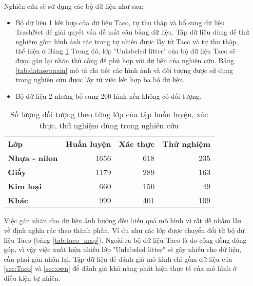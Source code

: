\documentclass[../the.tex]{subfiles}
\begin{document}
{\fontsize{13}{12} \selectfont

Nghiên cứu sẽ sử dụng các bộ dữ liệu như sau:

\begin{itemize}
	\item Bộ dữ liệu 1 kết hợp của dữ liệu Taco, tự thu thập và bổ sung dữ liệu TrashNet để giải quyết vấn đề mất cân bằng dữ liệu. Tập dữ liệu dùng để thử nghiệm gồm hình ảnh rác trong tự nhiên được lấy từ Taco và tự thu thập, thể hiện ở Bảng \ref{tab:datasettest}
	      Trong đó, lớp "Unlabeled litter" của bộ dữ liệu Taco sẽ được gán lại nhãn thủ công để phù hợp với dữ liệu của nghiên cứu. Bảng \ref{tab:datasetmain} mô tả chi tiết các hình ảnh và đối tượng được sử dụng trong nghiên cứu được lấy từ việc kết hợp ba bộ dữ liệu.\label{item:dataset}
	\item Bộ dữ liệu 2 nhưng bổ sung 200 hình nền không có đối tượng.
\end{itemize}

}

\begin{table}[!ht]
	\centering
	\caption{Số lượng đối tượng theo từng lớp của tập huấn luyện, xác thực, thử nghiệm dùng trong nghiên cứu}
	\begin{tabular}{|l|r|r|r|}
		\cline{1-4}
		\textbf{Lớp}          & \textbf{Huấn luyện} & \textbf{Xác thực} & \textbf{Thử nghiệm}\\ \cline{1-4}
		\textbf{Nhựa - nilon} & 1656 & 618 & 235                \\ \cline{1-4}
		\textbf{Giấy}         & 1179 & 289 & 163                \\ \cline{1-4}
		\textbf{Kim loại}     & 660 & 150 & 49               \\ \cline{1-4}
		\textbf{Khác}         & 999 & 401 & 109               \\ \cline{1-4}
	\end{tabular}

	\label{tab:datasettest}
\end{table}

{\fontsize{13}{12} \selectfont

Việc gán nhãn cho dữ liệu ảnh hưởng đến hiểu quả mô hình vì rất dễ nhầm lẫn về định nghĩa rác theo thành phần. Ví dụ như các lớp được chuyển đổi từ bộ dữ liệu Taco (bảng \ref{tab:taco_map}).
Ngoài ra bộ dữ liệu Taco là do cộng đồng đóng góp, vì vậy việc xuất hiện nhiều lớp "Unlabeled litter" sẽ gây nhiễu cho dữ liệu, cần phải gán nhãn lại.
Tập dữ liệu để đánh giá mô hình chỉ gồm dữ liệu của \ref{sec:Taco} và \ref{sec:own} để đánh giá khả năng phát hiện thực tế của mô hình ở điều kiện tự nhiên.

}
\end{document}
